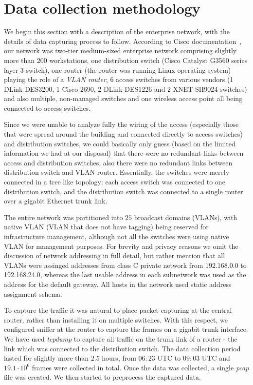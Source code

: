 \section{Data collection methodology}
\label{section:experiments}

We begin this section with a description of the enterprise network,
with the details of data capturing process to follow. According to 
Cisco documentation~\cite{cisco:ccent}, our network was two-tier 
medium-sized enterprise network comprising slightly more than 
$200$ workstations, one distribution switch (Cisco Catalyst 
G3560 series layer 3 switch), one router (the router was 
running Linux operating system) playing the role of a 
{\em VLAN router}, $6$ access switches from various vendors (1 DLink DES3200, 
1 Cisco 2690, 2 DLink DES1226 and 2 XNET SH9024 switches)
and also multiple, non-managed switches and one wireless 
access point all being connected to access switches.


Since we were unable to analyze fully the wiring of the access (especially those that were spread around the building and connected 
directly to access switches) and distribution switches, we could basically only guess (based on the limited information we had at our 
disposal) that there were no redundant links between access and distribution switches, also there were no redundant links between 
distribution switch and VLAN router. Essentially, the switches were merely connected in a tree like topology: each access switch was connected 
to one distribution switch, and the distribution switch was connected to a single router over a gigabit Ethernet trunk link. 

The entire network was partitioned into $25$ broadcast domains (VLANs), with native VLAN (VLAN that does not have tagging) being reserved 
for infrastructure management, although not all the switches were using native VLAN for management purposes. For brevity and privacy reasons 
we omit the discussion of network addressing in full detail, but rather mention that all VLANs were assinged addresses from class C private network from 
192.168.0.0 to 192.168.24.0, whereas the last usable address in each subnetwork was used as the address for the default gateway. 
All hosts in the network used static address assignment schema.

To capture the traffic it was natural to place packet capturing at 
the central router, rather than installing it on multiple 
switches. With this respect, we configured sniffer at the 
router to capture the frames on a gigabit trunk interface.
We have used {\em tcpdump} to capture all traffic on the trunk 
link of a router - the link which was connected to 
the distribution switch. The data collection period 
lasted for slightly more than $2.5$ hours, from 
$06:23$ UTC to $09:03$ UTC and $19.1 \cdot 10^6$ 
frames were collected in total. Once the data was 
collected, a single {\em pcap} file was created. 
We then started to preprocess the captured data.
